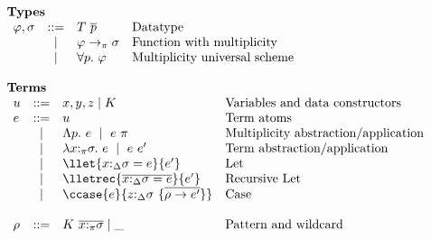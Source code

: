 
\begin{figure}[h]
\begin{framed}
\[
\begin{array}{l}
%
\textbf{Types} \\
\begin{array}{lcll}
    \varphi,\sigma  & ::=  & T~\overline{p}         & \textrm{Datatype} \\
                    & \mid & \varphi \to_\pi \sigma & \textrm{Function with multiplicity}\\
                    & \mid & \forall p.~\varphi     & \textrm{Multiplicity universal scheme}\\
\end{array}\\\\
%
\textbf{Terms}\\
\begin{array}{lcll}
    u                & ::=  & x,y,z \mid K                                                     & \textrm{Variables and data constructors}\\
    e                & ::=  & u                                                                & \textrm{Term atoms}\\
                     & \mid & \Lambda p.~e~\mid~e~\pi                                          & \textrm{Multiplicity abstraction/application}\\
                     & \mid & \lambda x{:}_\pi\sigma.~e~\mid~e~e'                           & \textrm{Term abstraction/application}\\
                     & \mid & \llet{x{:}_{\Delta}\sigma = e}{e'}                              & \textrm{Let} \\
                     & \mid & \lletrec{\overline{x{:}_{\Delta}\sigma = e}}{e'}             & \textrm{Recursive Let} \\
                     & \mid &
                     \ccase{e}{z{:}_{\Delta}\sigma~\{\overline{\rho\to e'}\}}   & \textrm{Case} \\
                     &      &                                                                  & \\
    \rho             & ::=  & K~\overline{x{:}_\pi\sigma} \mid \_                              & \textrm{Pattern and wildcard} \\

\end{array}
\end{array}\]
\end{framed}
\end{figure}
